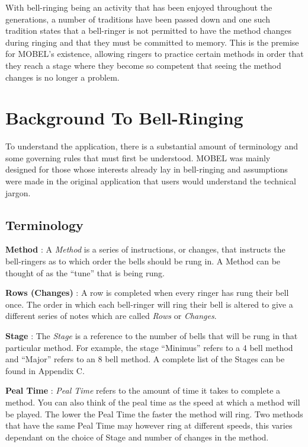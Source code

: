 \documentclass{l4proj}
\begin{document}
With bell-ringing being an activity that has been enjoyed throughout the generations, a number of traditions have been passed down and one such tradition states that a bell-ringer is not permitted to have the method changes during ringing and that they must be committed to memory.  This is the premise for MOBEL's existence,  allowing ringers to practice certain methods in order that they reach a stage where they become so competent that seeing the method changes is no longer a problem.  

\section{Background To Bell-Ringing}
To understand the application, there is a substantial amount of terminology and some governing rules that must first be understood.  MOBEL was mainly designed for those whose interests already lay in bell-ringing and assumptions were made in the original application that users would understand the technical jargon.  

\subsection{Terminology}
\textbf{Method} : A \textit{Method }is a series of instructions, or changes, that instructs the bell-ringers as to which order the bells should be rung in.  A Method can be thought of as the “tune” that is being rung.

\textbf{Rows (Changes)} : A row is completed when every ringer has rung their bell once.  The order in which each bell-ringer will ring their bell is altered to give a different series of notes which are called \textit{Rows} or \textit{Changes}.

\textbf{Stage} : The \textit{Stage} is a reference to the number of bells that will be rung in that particular method.  For example, the stage “Minimus” refers to a 4 bell method and “Major” refers to an 8 bell method.  A complete list of the Stages can be found in Appendix C.

%
%
 
\textbf{Peal Time} : \textit{Peal Time} refers to the amount of time it takes to complete a method. You can also think of the peal time as the speed at which a method will be played. The lower the Peal Time the faster the method will ring.  Two methods that have the same Peal Time may however ring at different speeds, this varies dependant on the choice of Stage and number of changes in the method.
\end{document}
